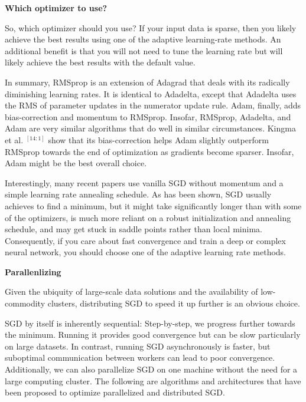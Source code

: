 \documentclass[4pt,journal,compsoc]{IEEEtran}
\begin{document}
\begin{flushleft}
    \textbf{\Large Which optimizer to use?} \newline
    
    So, which optimizer should you use? If your input data is sparse, then you likely achieve the best results using one of the adaptive learning-rate methods. An additional benefit is that you will not need to tune the learning rate but will likely achieve the best results with the default value. \newline
    
    In summary, RMSprop is an extension of Adagrad that deals with its radically diminishing learning rates. It is identical to Adadelta, except that Adadelta uses the RMS of parameter updates in the numerator update rule. Adam, finally, adds bias-correction and momentum to RMSprop. Insofar, RMSprop, Adadelta, and Adam are very similar algorithms that do well in similar circumstances. Kingma et al. $^ {[14:1]}$ show that its bias-correction helps Adam slightly outperform RMSprop towards the end of optimization as gradients become sparser. Insofar, Adam might be the best overall choice. \newline
    
    Interestingly, many recent papers use vanilla SGD without momentum and a simple learning rate annealing schedule. As has been shown, SGD usually achieves to find a minimum, but it might take significantly longer than with some of the optimizers, is much more reliant on a robust initialization and annealing schedule, and may get stuck in saddle points rather than local minima. Consequently, if you care about fast convergence and train a deep or complex neural network, you should choose one of the adaptive learning rate methods. \newline
    
    \textbf{\Large Parallenlizing} \newline
    \label{sec:parallelizing}
    
    Given the ubiquity of large-scale data solutions and the availability of low-commodity clusters, distributing SGD to speed it up further is an obvious choice. \newline
    
    SGD by itself is inherently sequential: Step-by-step, we progress further towards the minimum. Running it provides good convergence but can be slow particularly on large datasets. In contrast, running SGD asynchronously is faster, but suboptimal communication between workers can lead to poor convergence. Additionally, we can also parallelize SGD on one machine without the need for a large computing cluster. The following are algorithms and architectures that have been proposed to optimize parallelized and distributed SGD. \newline \newline
    

\end{flushleft}
\end{document}
